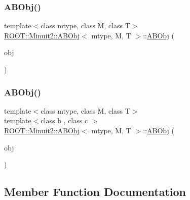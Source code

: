 \subsubsection{\texorpdfstring{ABObj()}{ABObj()}\hspace{0.1cm}{\footnotesize\ttfamily [7/8]}}
{\footnotesize\ttfamily template$<$class mtype, class M, class T$>$ \\
\mbox{\hyperlink{classROOT_1_1Minuit2_1_1ABObj}{R\+O\+O\+T\+::\+Minuit2\+::\+A\+B\+Obj}}$<$ mtype, M, T $>$\+::\mbox{\hyperlink{classROOT_1_1Minuit2_1_1ABObj}{A\+B\+Obj}} (\begin{DoxyParamCaption}\item[{const \mbox{\hyperlink{classROOT_1_1Minuit2_1_1ABObj}{A\+B\+Obj}}$<$ mtype, M, T $>$ \&}]{obj }\end{DoxyParamCaption})\hspace{0.3cm}{\ttfamily [inline]}}

\mbox{\label{classROOT_1_1Minuit2_1_1ABObj_af629f9c316122395ab94459e6cf6ed30}} 
\subsubsection{\texorpdfstring{ABObj()}{ABObj()}\hspace{0.1cm}{\footnotesize\ttfamily [8/8]}}
{\footnotesize\ttfamily template$<$class mtype, class M, class T$>$ \\
template$<$class b , class c $>$ \\
\mbox{\hyperlink{classROOT_1_1Minuit2_1_1ABObj}{R\+O\+O\+T\+::\+Minuit2\+::\+A\+B\+Obj}}$<$ mtype, M, T $>$\+::\mbox{\hyperlink{classROOT_1_1Minuit2_1_1ABObj}{A\+B\+Obj}} (\begin{DoxyParamCaption}\item[{const \mbox{\hyperlink{classROOT_1_1Minuit2_1_1ABObj}{A\+B\+Obj}}$<$ mtype, b, c $>$ \&}]{obj }\end{DoxyParamCaption})\hspace{0.3cm}{\ttfamily [inline]}}



\subsection{Member Function Documentation}
\mbox{\label{classROOT_1_1Minuit2_1_1ABObj_aa640f928a8ec245b70d4ac294e1418e5}} 

